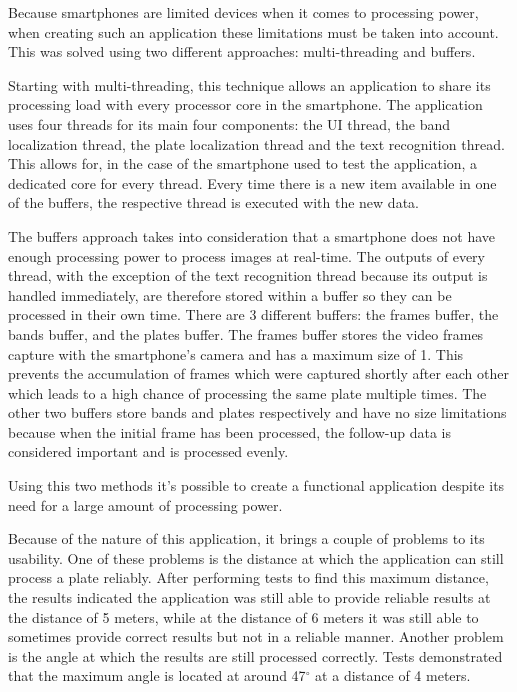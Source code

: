 
Because smartphones are limited devices when it comes to processing power, when creating such an application these limitations must be taken into account. This was solved using two different approaches: multi-threading and buffers.

Starting with multi-threading, this technique allows an application to share its processing load with every processor core in the smartphone. The application uses four threads for its main four components: the UI thread, the band localization thread, the plate localization thread and the text recognition thread. This allows for, in the case of the smartphone used to test the application, a dedicated core for every thread. Every time there is a new item available in one of the buffers, the respective thread is executed with the new data.

The buffers approach takes into consideration that a smartphone does not have enough processing power to process images at real-time. The outputs of every thread, with the exception of the text recognition thread because its output is handled immediately, are therefore stored within a buffer so they can be processed in their own time. There are 3 different buffers: the frames buffer, the bands buffer, and the plates buffer. 
The frames buffer stores the video frames capture with the smartphone's camera and has a maximum size of 1. This prevents the accumulation of frames which were captured shortly after each other which leads to a high chance of processing the same plate multiple times. The other two buffers store bands and plates respectively and have no size limitations because when the initial frame has been processed, the follow-up data is considered important and is processed evenly.

Using this two methods it's possible to create a functional application despite its need for a large amount of processing power.



Because of the nature of this application, it brings a couple of problems to its usability. One of these problems is the distance at which the application can still process a plate reliably. After performing tests to find this maximum distance, the results indicated the application was still able to provide reliable results at the distance of 5 meters, while at the distance of 6 meters it was still able to sometimes provide correct results but not in a reliable manner. Another problem is the angle at which the results are still processed correctly. Tests demonstrated that the maximum angle is located at around 47$^{\circ}$ at a distance of 4 meters. 



